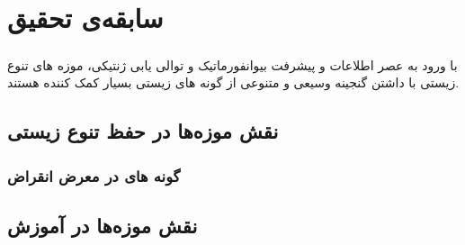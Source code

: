 
\chapter{سابقه‌ی تحقیق} \label{chapter:related-works}

\paragraph*{}

با ورود به عصر اطلاعات و پیشرفت بیوانفورماتیک و توالی یابی ژنتیکی، موزه های تنوع زیستی با داشتن گنجینه وسیعی و متنوعی از گونه های زیستی بسیار کمک کننده هستند.

\section{نقش موزه‌ها در حفظ تنوع زیستی}
\subsection{گونه های در معرض انقراض}

\section{نقش موزه‌ها در آموزش}

\section{}